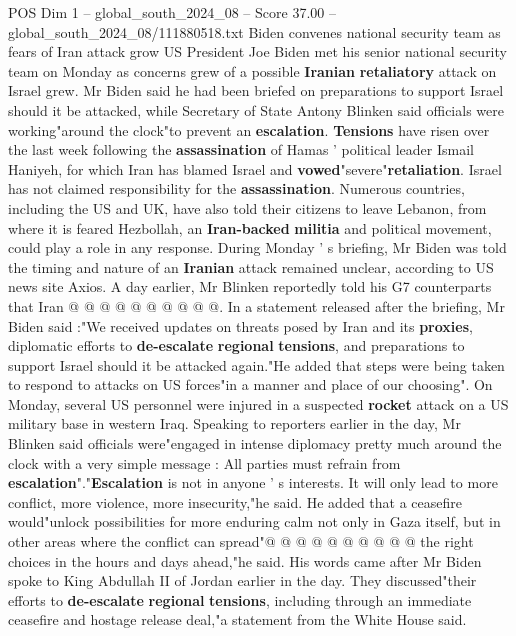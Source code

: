 \begin{textsample}{POS Dim 1 – global\_south\_2024\_08 – Score 37.00 – global\_south\_2024\_08/111880518.txt}  \label{ex:f1_pos_001}
Biden convenes national security team as fears of Iran attack grow US President Joe Biden met his senior national security team on Monday as concerns grew of a possible \textbf{Iranian} \textbf{retaliatory} attack on Israel grew.
Mr Biden said he had been briefed on preparations to support Israel should it be attacked, while Secretary of State Antony Blinken said officials were working"around the clock"to prevent an \textbf{escalation}. \textbf{Tensions} have risen over the last week following the \textbf{assassination} of Hamas ' political leader Ismail Haniyeh, for which Iran has blamed Israel and \textbf{vowed}"severe"\textbf{retaliation}.
Israel has not claimed responsibility for the \textbf{assassination}.
Numerous countries, including the US and UK, have also told their citizens to leave Lebanon, from where it is feared Hezbollah, an \textbf{Iran-backed} \textbf{militia} and political movement, could play a role in any response.
During Monday ' s briefing, Mr Biden was told the timing and nature of an \textbf{Iranian} attack remained unclear, according to US news site Axios.
A day earlier, Mr Blinken reportedly told his G7 counterparts that Iran @ @ @ @ @ @ @ @ @ @.
In a statement released after the briefing, Mr Biden said :"We received updates on threats posed by Iran and its \textbf{proxies}, diplomatic efforts to \textbf{de-escalate} \textbf{regional} \textbf{tensions}, and preparations to support Israel should it be attacked again."He added that steps were being taken to respond to attacks on US forces"in a manner and place of our choosing".
On Monday, several US personnel were injured in a suspected \textbf{rocket} attack on a US military base in western Iraq.
Speaking to reporters earlier in the day, Mr Blinken said officials were"engaged in intense diplomacy pretty much around the clock with a very simple message : All parties must refrain from \textbf{escalation}"."\textbf{Escalation} is not in anyone ' s interests.
It will only lead to more conflict, more violence, more insecurity,"he said.
He added that a ceasefire would"unlock possibilities for more enduring calm not only in Gaza itself, but in other areas where the conflict can spread"@ @ @ @ @ @ @ @ @ @ the right choices in the hours and days ahead,"he said.
His words came after Mr Biden spoke to King Abdullah II of Jordan earlier in the day.
They discussed"their efforts to \textbf{de-escalate} \textbf{regional} \textbf{tensions}, including through an immediate ceasefire and hostage release deal,"a statement from the White House said.

\end{textsample}

